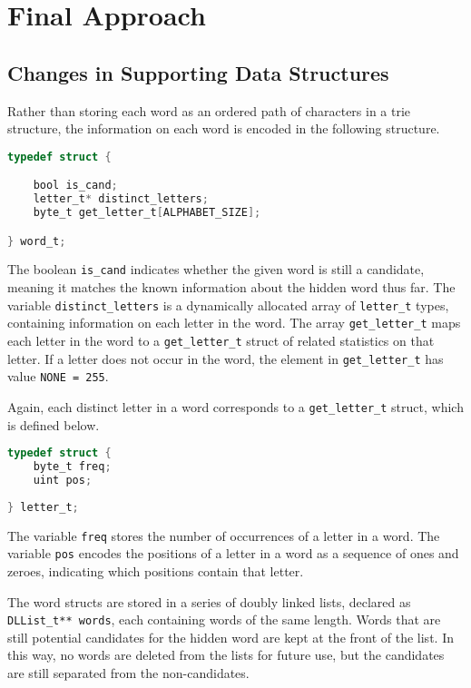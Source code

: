 \documentclass[journal, a4paper]{IEEEtran}
\begin{document}
\section{Final Approach}

\subsection{Changes in Supporting Data Structures}
Rather than storing each word as an ordered path of characters in a trie structure, the information on each word is encoded in the following structure.

\begin{lstlisting}[language=C, caption=Word Struct in "hangman.h"]
typedef struct {

    bool is_cand;                         
    letter_t* distinct_letters;          
    byte_t get_letter_t[ALPHABET_SIZE];

} word_t;
\end{lstlisting}

The boolean \texttt{is\_cand} indicates whether the given word is still a candidate, meaning it matches the known information about the hidden word thus far. The variable \texttt{distinct\_letters} is a dynamically allocated array of  \texttt{letter\_t} types, containing information on each letter in the word. The array \texttt{get\_letter\_t} maps each letter in the word to a \texttt{get\_letter\_t} struct of related statistics on that letter. If a letter does not occur in the word, the element in \texttt{get\_letter\_t} has value \texttt{NONE = 255}.

Again, each distinct letter in a word corresponds to a \texttt{get\_letter\_t} struct, which is defined below.

\begin{lstlisting}[language=C, caption=Letter Struct in "hangman.h"]
typedef struct {
    byte_t freq;  
    uint pos;    
    
} letter_t;
\end{lstlisting}

The variable \texttt{freq} stores the number of occurrences of a letter in a word. The variable \texttt{pos} encodes the positions of a letter in a word as a sequence of ones and zeroes, indicating which positions contain that letter.

The word structs are stored in a series of doubly linked lists, declared as \texttt{DLList\_t** words}, each containing words of the same length. Words that are still potential candidates for the hidden word are kept at the front of the list. In this way, no words are deleted from the lists for future use, but the candidates are still separated from the non-candidates.
\end{document}

